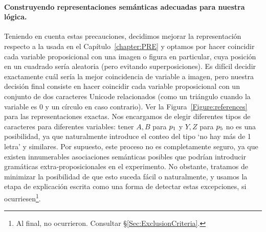 \paragraph{Construyendo representaciones semánticas adecuadas para nuestra lógica.}

Teniendo en cuenta estas precauciones, decidimos mejorar la representación respecto a la usada en el Capítulo~\ref{chapter:PRE} y optamos por hacer coincidir cada variable proposicional con una imagen o figura en particular, cuya posición en un cuadrado sería aleatoria (pero evitando superposiciones). Es difícil decidir exactamente cuál sería la mejor coincidencia de variable a imagen, pero nuestra decisión final consiste en hacer coincidir cada variable proposicional con un conjunto de dos caracteres Unicode relacionados (como un triángulo cuando la variable es $ 0 $ y un círculo en caso contrario). Ver la Figura~\ref{Figure:references} para las representaciones exactas. Nos encargamos de elegir diferentes tipos de caracteres para diferentes variables: tener $ A, B $ para $ p_1 $ y $ Y, Z $ para $ p_5 $ no es una posibilidad, ya que naturalmente introduce el conteo del tipo `no hay más de 1 letra' y similares. Por supuesto, este proceso no es completamente seguro, ya que existen innumerables asociaciones semánticas posibles que podrían introducir gramáticas extra-proposicionales en el experimento. No obstante, tratamos de minimizar la posibilidad de que esto suceda fácil o naturalmente, y usamos la etapa de explicación escrita como una forma de detectar estas excepciones, si ocurriesen\footnote {Al final, no ocurrieron. Consultar \S\ref{Sec:ExclusionCriteria}.}.


